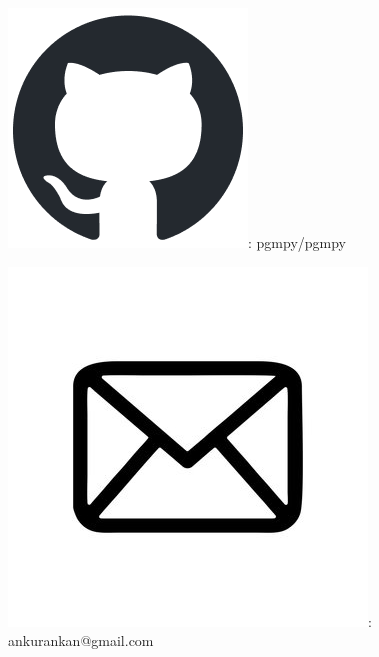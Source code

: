 \documentclass[aspectratio=169]{beamer}
\newcommand\github{\includegraphics[height=2ex]{imgs/github.png}}
\newcommand\email{\includegraphics[height=3ex]{imgs/email.png}}
\begin{document}
\begin{frame}
	\vspace{5em}

	\github : pgmpy/pgmpy
	\vspace{1em}

	\email : ankurankan@gmail.com
\end{frame}

% 
\end{document}
